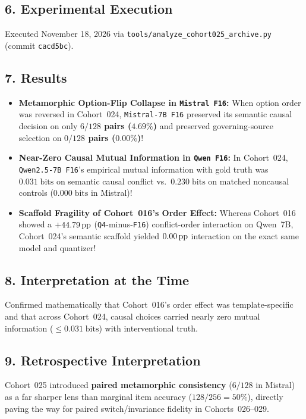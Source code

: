 \subsection*{6. Experimental Execution}
Executed November 18, 2026 via \texttt{tools/analyze\_cohort025\_archive.py} (commit \texttt{cacd5bc}).

\subsection*{7. Results}
\begin{itemize}
  \item \textbf{Metamorphic Option-Flip Collapse in \texttt{Mistral F16}:} When option order was reversed in Cohort~024, \texttt{Mistral-7B F16} preserved its semantic causal decision on only \textbf{$6/128$ pairs ($4.69\%$)} and preserved governing-source selection on \textbf{$0/128$ pairs ($0.00\%$)}!
  \item \textbf{Near-Zero Causal Mutual Information in \texttt{Qwen F16}:} In Cohort~024, \texttt{Qwen2.5-7B F16}'s empirical mutual information with gold truth was \textbf{$0.031\;\text{bits}$} on semantic causal conflict vs.\ \textbf{$0.230\;\text{bits}$} on matched noncausal controls ($0.000\;\text{bits}$ in Mistral)!
  \item \textbf{Scaffold Fragility of Cohort~016's Order Effect:} Whereas Cohort~016 showed a $+44.79\,\mathrm{pp}$ (\texttt{Q4}-minus-\texttt{F16}) conflict-order interaction on Qwen~7B, Cohort~024's semantic scaffold yielded \textbf{$0.00\,\mathrm{pp}$} interaction on the exact same model and quantizer!
\end{itemize}

\subsection*{8. Interpretation at the Time}
Confirmed mathematically that Cohort~016's order effect was template-specific and that across Cohort~024, causal choices carried nearly zero mutual information ($\le 0.031\;\text{bits}$) with interventional truth.

\subsection*{9. Retrospective Interpretation}
Cohort~025 introduced \textbf{paired metamorphic consistency} ($6/128$ in Mistral) as a far sharper lens than marginal item accuracy ($128/256 = 50\%$), directly paving the way for paired switch/invariance fidelity in Cohorts~026--029.

